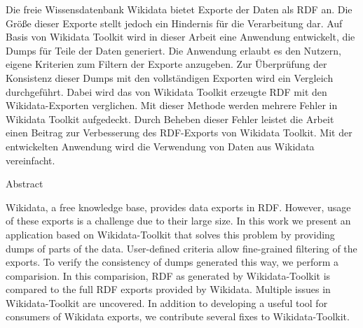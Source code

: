 %
\label{sec:abstract}
Die freie Wissensdatenbank Wikidata bietet Exporte der Daten als RDF an.
Die Größe dieser Exporte stellt jedoch ein Hindernis für die Verarbeitung dar.
Auf Basis von Wikidata Toolkit wird in dieser Arbeit eine Anwendung entwickelt, die Dumps für Teile der Daten generiert.
Die Anwendung erlaubt es den Nutzern, eigene Kriterien zum Filtern der Exporte anzugeben.
Zur Überprüfung der Konsistenz dieser Dumps mit den vollständigen Exporten wird ein Vergleich durchgeführt.
Dabei wird das von Wikidata Toolkit erzeugte RDF mit den Wikidata-Exporten verglichen.
Mit dieser Methode werden mehrere Fehler in Wikidata Toolkit aufgedeckt.
Durch Beheben dieser Fehler leistet die Arbeit einen Beitrag zur Verbesserung des RDF-Exports von Wikidata Toolkit.
Mit der entwickelten Anwendung wird die Verwendung von Daten aus Wikidata vereinfacht.

\vspace*{20mm}

{Abstract}
\label{sec:abstract-diff}

Wikidata, a free knowledge base, provides data exports in RDF.
However, usage of these exports is a challenge due to their large size.
In this work we present an application based on Wikidata-Toolkit that solves this problem by providing dumps of parts of the data.
User-defined criteria allow fine-grained filtering of the exports.
To verify the consistency of dumps generated this way, we perform a comparision.
In this comparision, RDF as generated by Wikidata-Toolkit is compared to the full RDF exports provided by Wikidata.
Multiple issues in Wikidata-Toolkit are uncovered.
In addition to developing a useful tool for consumers of Wikidata exports, we contribute several fixes to Wikidata-Toolkit.